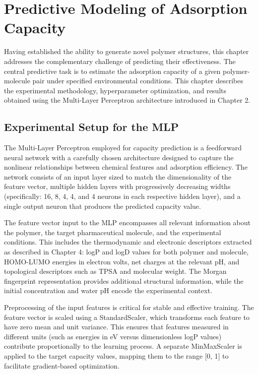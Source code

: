 \chapter{Predictive Modeling of Adsorption Capacity}
\label{sec:predictive_chapter}

Having established the ability to generate novel polymer structures, this chapter addresses the complementary challenge of predicting their effectiveness. The central predictive task is to estimate the adsorption capacity of a given polymer-molecule pair under specified environmental conditions. This chapter describes the experimental methodology, hyperparameter optimization, and results obtained using the Multi-Layer Perceptron architecture introduced in Chapter 2.

\section{Experimental Setup for the MLP}
\label{sec:mlp_setup}

The Multi-Layer Perceptron employed for capacity prediction is a feedforward neural network with a carefully chosen architecture designed to capture the nonlinear relationships between chemical features and adsorption efficiency. The network consists of an input layer sized to match the dimensionality of the feature vector, multiple hidden layers with progressively decreasing widths (specifically: 16, 8, 4, 4, and 4 neurons in each respective hidden layer), and a single output neuron that produces the predicted capacity value.

The feature vector input to the MLP encompasses all relevant information about the polymer, the target pharmaceutical molecule, and the experimental conditions. This includes the thermodynamic and electronic descriptors extracted as described in Chapter 4: logP and logD values for both polymer and molecule, HOMO-LUMO energies in electron volts, net charges at the relevant pH, and topological descriptors such as TPSA and molecular weight. The Morgan fingerprint representation provides additional structural information, while the initial concentration and water pH encode the experimental context.

Preprocessing of the input features is critical for stable and effective training. The feature vector is scaled using a StandardScaler, which transforms each feature to have zero mean and unit variance. This ensures that features measured in different units (such as energies in eV versus dimensionless logP values) contribute proportionally to the learning process. A separate MinMaxScaler is applied to the target capacity values, mapping them to the range [0, 1] to facilitate gradient-based optimization.

